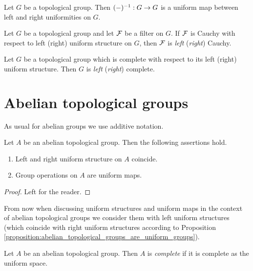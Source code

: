 \documentclass[10pt]{amsart}
\begin{document}
\begin{fact}\label{fact:inverse_is_an_isomorphism_of_left_and_right_uniform_structures}
	Let $G$ be a topological group. Then $(-)^{-1}:G\rightarrow G$ is a uniform map between left and right uniformities on $G$.
\end{fact}

\begin{definition}
	Let $G$ be a topological group and let ${\mathcal F}$ be a filter on $G$. If ${\mathcal F}$ is Cauchy with respect to left (right) uniform structure on $G$, then ${\mathcal F}$ is \textit{left} (\textit{right}) Cauchy.
\end{definition}

\begin{definition}
	Let $G$ be a topological group which is complete with respect to its left (right) uniform structure. Then $G$ is \textit{left} (\textit{right}) complete.
\end{definition}

\section{Abelian topological groups}
\noindent
As usual for abelian groups we use additive notation.

\begin{proposition}\label{proposition:abelian_topological_groups_are_uniform_groups}
	Let $A$ be an abelian topological group. Then the following assertions hold.
	\begin{enumerate}[label=\emph{\textbf{(\arabic*)}}, leftmargin=3.0em]
		\item Left and right uniform structure on $A$ coincide.
		\item Group operations on $A$ are uniform maps.
	\end{enumerate}
\end{proposition}
\begin{proof}
	Left for the reader.
\end{proof}
\noindent
From now when discussing uniform structures and uniform maps in the context of abelian topological groups we consider them with left uniform structures (which coincide with right uniform structures according to Proposition \ref{proposition:abelian_topological_groups_are_uniform_groups}).

\begin{definition}
	Let $A$ be an abelian topological group. Then $A$ is \textit{complete} if it is complete as the uniform space.
\end{definition}
\end{document}

